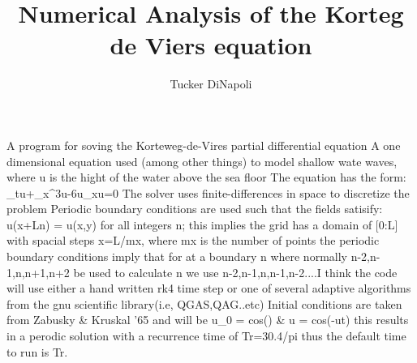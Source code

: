 \documentclass{article}
\author{Tucker DiNapoli}
\title{Numerical Analysis of the Korteg de Viers equation}
\begin{document}
\maketitle

A program for soving the Korteweg-de-Vires partial differential equation
A one dimensional equation used (among other things) to model shallow wate
waves, where u is the hight of the water above the sea floor
The equation has the form:
\partial_tu+\partial_x^3u-6u\partial_xu=0
The solver uses finite-differences in space to discretize the problem
Periodic boundary conditions are used such that the fields satisify:
u(x+Ln) = u(x,y) for all integers n; this implies the grid has a domain of
[0:L] with spacial steps \Delta x=L/mx, where mx is the number of points
the periodic boundary conditions imply that for at a boundary n
where normally n-2,n-1,n,n+1,n+2 be used to calculate n we use
n-2,n-1,n,n-1,n-2....I think
the code will use either a hand written rk4 time step or one of several
adaptive algorithms from the gnu scientific library(i.e, QGAS,QAG..etc)
Initial conditions are taken from Zabusky \& Kruskal '65 and will be
u_0 = cos(\pix) \& u = cos(\pix-ut)
this results in a perodic solution with a recurrence time of Tr=30.4/pi
thus the default time to run is Tr.
\end{document}
